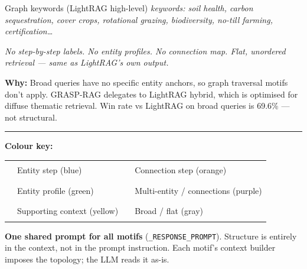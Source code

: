 \documentclass{article}
\newcommand{\fn}[1]{\texttt{\footnotesize\color{gray!70}#1}}
\begin{document}
\begin{minipage}[t]{0.487\textwidth}
\vspace{3pt}

\begin{broadbox}{Graph keywords (LightRAG high-level)}
\scriptsize\sffamily\color{gray!80}
\textit{keywords: soil health, carbon sequestration, cover crops,
rotational grazing, biodiversity, no-till farming, certification\ldots}
\end{broadbox}

\vspace{3pt}

{\scriptsize\sffamily\color{gray!60}
\textit{No step-by-step labels. No entity profiles. No connection map.
Flat, unordered retrieval — same as LightRAG's own output.}}

\vspace{4pt}
\begin{tcolorbox}[colback=gray!8, colframe=gray!30, boxrule=0.6pt, arc=3pt,
  top=3pt, bottom=3pt, left=5pt, right=4pt]
\scriptsize\sffamily\color{gray!80}
\textbf{Why:} Broad queries have no specific entity anchors, so graph
traversal motifs don't apply. GRASP-RAG delegates to LightRAG hybrid,
which is optimised for diffuse thematic retrieval.
Win rate vs LightRAG on broad queries is 69.6\% — not structural.
\end{tcolorbox}

\end{minipage}

\vspace{6pt}
\noindent\rule{\linewidth}{0.5pt}
\vspace{3pt}

\begin{minipage}[t]{0.52\textwidth}
{\scriptsize\sffamily
\textbf{Colour key:}
\begin{tabular}{@{}l@{\;=\;}l@{\quad}l@{\;=\;}l@{}}
  \textcolor{graspblue}{\rule{6pt}{6pt}} & Entity step (blue) &
  \textcolor{orange!80!black}{\rule{6pt}{6pt}} & Connection step (orange) \\
  \textcolor{green!50!black}{\rule{6pt}{6pt}} & Entity profile (green) &
  \textcolor{violet!70!black}{\rule{6pt}{6pt}} & Multi-entity / connections (purple) \\
  \textcolor{yellow!70!black}{\rule{6pt}{6pt}} & Supporting context (yellow) &
  \textcolor{gray!60}{\rule{6pt}{6pt}} & Broad / flat (gray) \\
\end{tabular}}
\end{minipage}
\hfill
\begin{minipage}[t]{0.44\textwidth}
\begin{tcolorbox}[colback=graspblue!5, colframe=graspblue!30, boxrule=0.6pt,
  arc=3pt, top=3pt, bottom=3pt, left=5pt, right=4pt]
\scriptsize\sffamily\color{graspblue!80}
\textbf{One shared prompt for all motifs} (\fn{\_RESPONSE\_PROMPT}).
Structure is entirely in the context, not in the prompt instruction.
Each motif's context builder imposes the topology; the LLM reads it as-is.
\end{tcolorbox}
\end{minipage}
\end{document}
